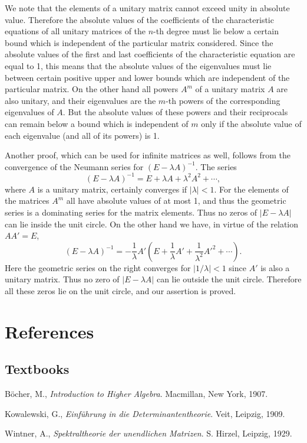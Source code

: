 We note that the elements of a unitary matrix cannot exceed unity in absolute value. Therefore the absolute values of the coefficients of the characteristic equations of all unitary matrices of the $n$-th degree must lie below a certain bound which is independent of the particular matrix considered. Since the absolute values of the first and last coefficients of the characteristic equation are equal to 1, this means that the absolute values of the eigenvalues must lie between certain positive upper and lower bounds which are independent of the particular matrix. On the other hand all powers $A^m$ of a unitary matrix $A$ are also unitary, and their eigenvalues are the $m$-th powers of the corresponding eigenvalues of $A$. But the absolute values of these powers and their reciprocals can remain below a bound which is independent of $m$ only if the absolute value of each eigenvalue (and all of its powers) is 1.

Another proof, which can be used for infinite matrices as well, follows from the convergence of the Neumann series for $(E-\lambda A)^{-1}$. The series
\[
(E-\lambda A)^{-1}=E+\lambda A+\lambda^2A^2+\cdots,
\]
where $A$ is a unitary matrix, certainly converges if $|\lambda|<1$. For the elements of the matrices $A^m$ all have absolute values of at most 1, and thus the geometric series is a dominating series for the matrix elements. Thus no zeros of $|E-\lambda A|$ can lie inside the unit circle. On the other hand we have, in virtue of the relation $AA'=E$,
\[
(E-\lambda A)^{-1}=-\frac{1}{\lambda}A'\left(E+\frac{1}{\lambda}A'+\frac{1}{\lambda^2}A'^2+\cdots\right).
\]
Here the geometric series on the right converges for $|1/\lambda|<1$ since $A'$ is also a unitary matrix. Thus no zero of $|E-\lambda A|$ can lie outside the unit circle. Therefore all these zeros lie on the unit circle, and our assertion is proved.

\section*{References}
\subsection*{Textbooks}
B\"ocher, M., \emph{Introduction to Higher Algebra}. Macmillan, New York, 1907.

Kowalewski, G., \emph{Einf\"uhrung in die Determinantentheorie}. Veit, Leipzig, 1909.

Wintner, A., \emph{Spektraltheorie der unendlichen Matrizen}. S. Hirzel, Leipzig, 1929.

